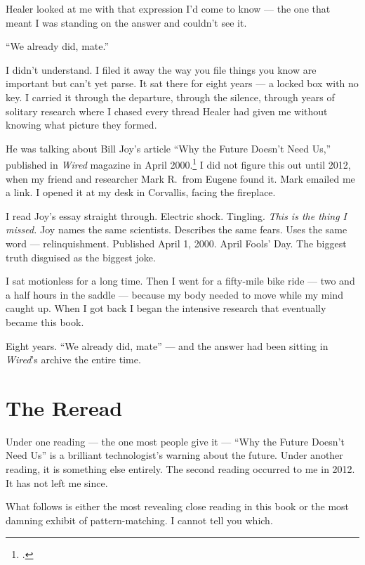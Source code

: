 Healer looked at me with that expression I'd come to know --- the one that meant I was standing on the answer and couldn't see it.

``We already did, mate.''

I didn't understand. I filed it away the way you file things you know are important but can't yet parse. It sat there for eight years --- a locked box with no key. I carried it through the departure, through the silence, through years of solitary research where I chased every thread Healer had given me without knowing what picture they formed.

He was talking about Bill Joy's article ``Why the Future Doesn't Need Us,'' published in \textit{Wired} magazine in April 2000.\footcite{joy2000} I did not figure this out until 2012, when my friend and researcher Mark R.\ from Eugene found it. Mark emailed me a link. I opened it at my desk in Corvallis, facing the fireplace.

I read Joy's essay straight through. Electric shock. Tingling. \textit{This is the thing I missed.} Joy names the same scientists. Describes the same fears. Uses the same word --- relinquishment. Published April 1, 2000. April Fools' Day. The biggest truth disguised as the biggest joke.

I sat motionless for a long time. Then I went for a fifty-mile bike ride --- two and a half hours in the saddle --- because my body needed to move while my mind caught up. When I got back I began the intensive research that eventually became this book.

Eight years. ``We already did, mate'' --- and the answer had been sitting in \textit{Wired}'s archive the entire time.

\section*{The Reread}
\label{record:dep-the-reread}

Under one reading --- the one most people give it --- ``Why the Future Doesn't Need Us'' is a brilliant technologist's warning about the future. Under another reading, it is something else entirely. The second reading occurred to me in 2012. It has not left me since.

\vspace{0.5cm}

What follows is either the most revealing close reading in this book or the most damning exhibit of pattern-matching. I cannot tell you which.

